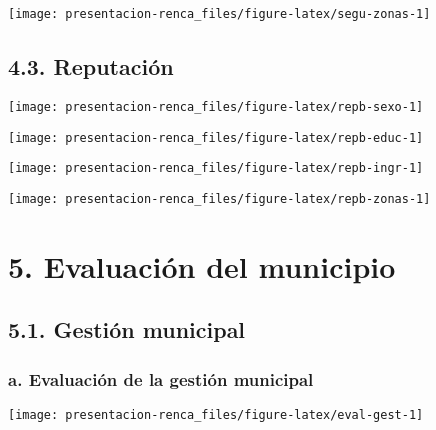 \documentclass[
]{article}
\begin{document}
\begin{flushleft}\texttt{[image: presentacion-renca\_files/figure-latex/segu-zonas-1]} \end{flushleft}

\hypertarget{reputaciuxf3n}{%
\subsection{4.3. Reputación}\label{reputaciuxf3n}}

\begin{flushleft}\texttt{[image: presentacion-renca\_files/figure-latex/repb-sexo-1]} \end{flushleft}

\begin{flushleft}\texttt{[image: presentacion-renca\_files/figure-latex/repb-educ-1]} \end{flushleft}

\begin{flushleft}\texttt{[image: presentacion-renca\_files/figure-latex/repb-ingr-1]} \end{flushleft}

\begin{flushleft}\texttt{[image: presentacion-renca\_files/figure-latex/repb-zonas-1]} \end{flushleft}

\hypertarget{evaluaciuxf3n-del-municipio}{%
\section{5. Evaluación del
municipio}\label{evaluaciuxf3n-del-municipio}}

\hypertarget{gestiuxf3n-municipal}{%
\subsection{5.1. Gestión municipal}\label{gestiuxf3n-municipal}}

\hypertarget{a.-evaluaciuxf3n-de-la-gestiuxf3n-municipal}{%
\subsubsection{a. Evaluación de la gestión
municipal}\label{a.-evaluaciuxf3n-de-la-gestiuxf3n-municipal}}

\begin{flushleft}\texttt{[image: presentacion-renca\_files/figure-latex/eval-gest-1]} \end{flushleft}
\end{document}
